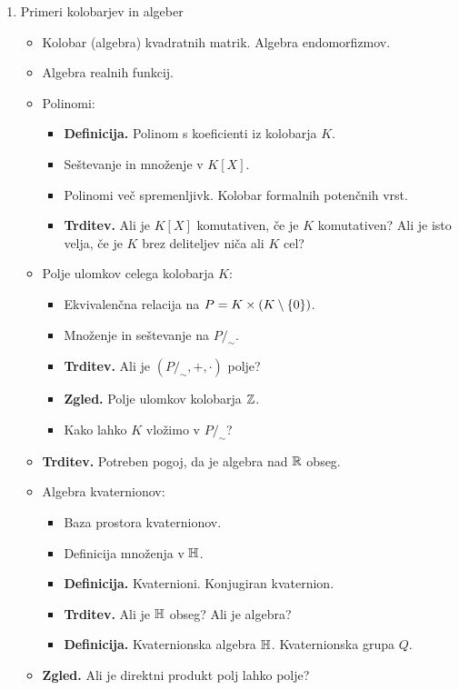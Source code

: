 \begin{enumerate}
    \item Primeri kolobarjev in algeber
    \begin{itemize}
        \item Kolobar (algebra) kvadratnih matrik. Algebra endomorfizmov.
        \item Algebra realnih funkcij.
        \item Polinomi:
        \begin{itemize}
            \item \textbf{Definicija.} Polinom s koeficienti iz kolobarja \(K\).
            \item Seštevanje in množenje v \(K[X]\).
            \item Polinomi več spremenljivk. Kolobar formalnih potenčnih vrst.
            \item \textbf{Trditev.} Ali je \(K[X]\) komutativen, če je \(K\) komutativen? Ali je isto velja, če je \(K\) brez deliteljev niča ali \(K\) cel?
        \end{itemize}
        \item Polje ulomkov celega kolobarja \(K\):
        \begin{itemize}
            \item Ekvivalenčna relacija na \(P = K \times (K \setminus \{0\})\).
            \item Množenje in seštevanje na \(P/_\sim\).
            \item \textbf{Trditev.} Ali je \((P/_\sim, +, \cdot)\) polje?
            \item \textbf{Zgled.} Polje ulomkov kolobarja \(\mathbb{Z}\).
            \item Kako lahko \(K\) vložimo v \(P/_\sim\)?
        \end{itemize}
        \item \textbf{Trditev.} Potreben pogoj, da je algebra nad \(\mathbb{R}\) obseg.
        \item Algebra kvaternionov:
        \begin{itemize}
            \item Baza prostora kvaternionov.
            \item Definicija množenja v \(\mathbb{H}\).
            \item \textbf{Definicija.} Kvaternioni. Konjugiran kvaternion.
            \item \textbf{Trditev.} Ali je \(\mathbb{H}\) obseg? Ali je algebra?
            \item \textbf{Definicija.} Kvaternionska algebra \(\mathbb{H}\). Kvaternionska grupa \(Q\).
        \end{itemize}
        \item \textbf{Zgled.} Ali je direktni produkt polj lahko polje?
    \end{itemize}


\end{enumerate}
